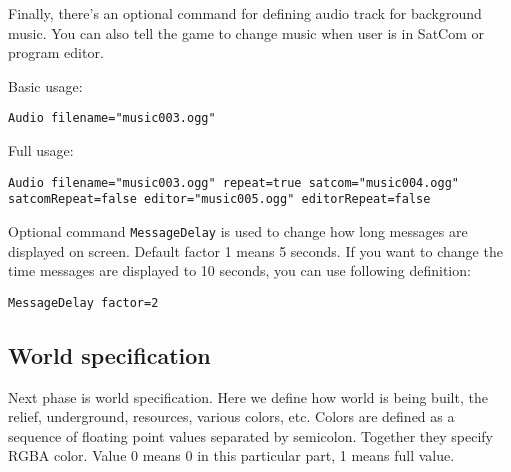 
Finally, there's an optional command for defining audio track for background music. You can also tell the game to change music when user is in SatCom or program editor.

Basic usage:
\begin{verbatim}
Audio filename="music003.ogg"
\end{verbatim}

Full usage:
\begin{verbatim}
Audio filename="music003.ogg" repeat=true satcom="music004.ogg" satcomRepeat=false editor="music005.ogg" editorRepeat=false
\end{verbatim}




Optional command \texttt{MessageDelay} is used to change how long messages are displayed on screen. Default factor 1 means 5 seconds. If you want to change the time messages are displayed to 10 seconds, you can use following definition:

\begin{lstlisting}[style=scene]
MessageDelay factor=2
\end{lstlisting}


\subsection{World specification}

Next phase is world specification. Here we define how world is being built, the relief, underground, resources, various colors, etc. Colors are defined as a sequence of floating point values separated by semicolon. Together they specify RGBA color. Value 0 means 0 in this particular part, 1 means full value.

